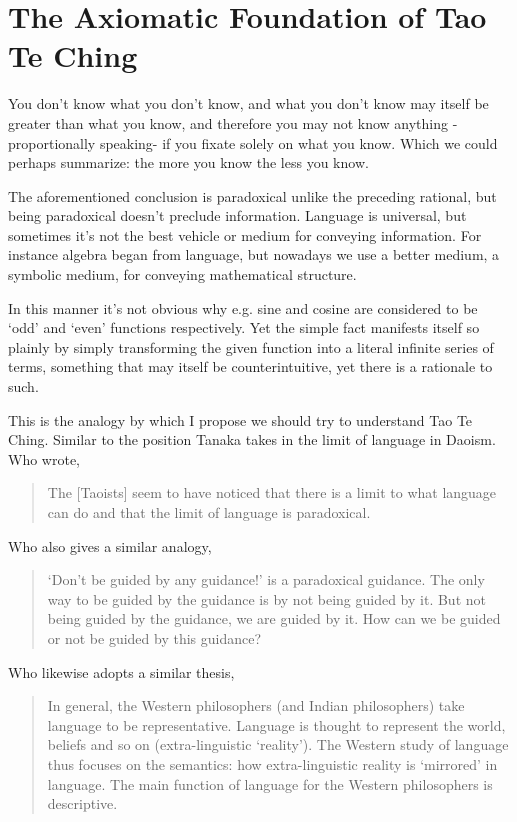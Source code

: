 \section{The Axiomatic Foundation of Tao Te Ching}

You don’t know what you don’t know, and what you don’t know may itself be greater than what you know, and therefore you may not know anything -proportionally speaking- if you fixate solely on what you know. Which we could perhaps summarize: the more you know the less you know.

The aforementioned conclusion is paradoxical unlike the preceding rational, but being paradoxical doesn’t preclude information. Language is universal, but sometimes it’s not the best vehicle or medium for conveying information. For instance algebra began from language, but nowadays we use a better medium, a symbolic medium, for conveying mathematical structure.

In this manner it’s not obvious why e.g. sine and cosine are considered to be `odd' and `even' functions respectively. Yet the simple fact manifests itself so plainly by simply transforming the given function into a literal infinite series of terms, something that may itself be counterintuitive, yet there is a rationale to such. 

This is the analogy by which I propose we should try to understand Tao Te Ching. Similar to the position Tanaka takes in the limit of language in Daoism. Who wrote,

\begin{quotation}
The [Taoists] seem to have noticed that there is a limit to what language can do and that the limit of language is paradoxical.
\end{quotation}

Who also gives a similar analogy, 
\begin{quotation}
‘Don’t be guided by any guidance!’ is a paradoxical guidance. The only way to be guided by the guidance is by not being guided by it. But not being guided by the guidance, we are guided by it. How can we be guided or not be guided by this guidance?
\end{quotation}

Who likewise adopts a similar thesis,
\begin{quotation}
In general, the Western philosophers (and Indian philosophers) take language to be representative. Language is thought to represent the world, beliefs and so on (extra-linguistic ‘reality’). The Western study of language thus focuses on the semantics: how extra-linguistic reality is ‘mirrored’ in language. The main function of language for the Western philosophers is descriptive.
\end{quotation}

